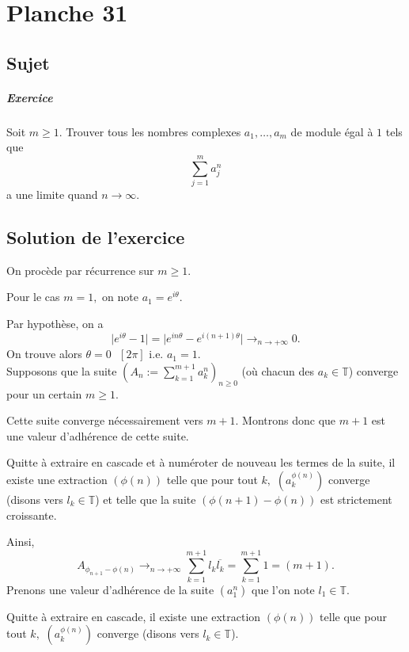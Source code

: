 \chapter{Planche 31}

\section{Sujet}

\paragraph{Exercice}
Soit $m \geqslant 1$. Trouver tous les nombres complexes $a_1,\dots,a_m$ de module égal à $1$ tels que
\[
\sum_{j=1}^m a_j^n
\]
a une limite quand $n \to \infty$.


\section{Solution de l'exercice}

On procède par récurrence sur $m\geq 1.$
 
Pour le cas $m=1,$ on note $a_{1}=e^{i\theta}.$

Par hypothèse, on a $$\vert e^{i\theta}-1\vert =\vert e^{in\theta}-e^{i(n+1)\theta}\vert \longrightarrow_{n\rightarrow +\infty} 0.$$ On trouve alors $\theta=0\mbox{ }[2\pi]$ i.e. $a_{1}=1.$\\


Supposons que la suite $\displaystyle\left(A_{n}:=\sum_{k=1}^{m+1}a_{k}^{n}\right)_{n\geq 0}$ (où chacun des $a_{k}\in\mathbb{T}$) converge pour un certain $m\geq 1.$

Cette suite converge nécessairement vers $m+1.$ Montrons donc que $m+1$ est une valeur d'adhérence de cette suite.

Quitte à extraire en cascade et à numéroter de nouveau les termes de la suite, il existe une extraction $(\phi(n))$ telle que pour tout $k,$ $(a_{k}^{\phi(n)})$ converge (disons vers $l_{k}\in\mathbb{T}$) et telle que la suite $(\phi(n+1)-\phi(n))$ est strictement croissante.

Ainsi, $$A_{\phi_{n+1}-\phi(n)}\longrightarrow_{n\rightarrow +\infty} \sum_{k=1}^{m+1}l_{k}\overline{l_{k}}=\sum_{k=1}^{m+1}1=(m+1).$$ 
Prenons une valeur d'adhérence de la suite $(a_{1}^{n})$ que l'on note $l_{1}\in\mathbb{T}.$

Quitte à extraire en cascade, il existe une extraction $(\phi(n))$ telle que pour tout $k,$ $(a_{k}^{\phi(n)})$ converge (disons vers $l_{k}\in\mathbb{T}$).

